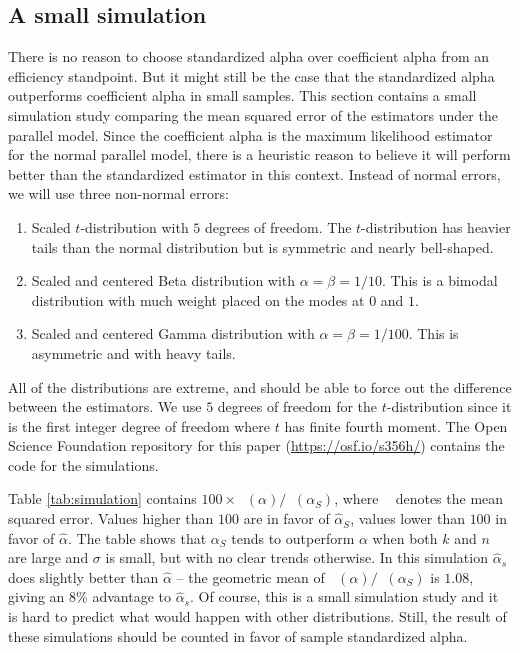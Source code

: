\documentclass[twoside]{article}
\DeclareMathOperator{\MSE}{MSE_Z}
\begin{document}
\subsection{A small simulation}
There is no reason to choose standardized alpha over coefficient alpha from an efficiency standpoint. But it might still be the case
that the standardized alpha outperforms coefficient alpha
in small samples. This section contains a small simulation
study comparing the mean squared error of the estimators under
the parallel model. Since the coefficient alpha is the maximum likelihood
estimator for the normal parallel model, there is a heuristic reason
to believe it will perform better than the standardized estimator
in this context. Instead of normal errors, we will use three non-normal
errors:

\begin{enumerate}
\item Scaled $t$-distribution with $5$ degrees of freedom. The $t$-distribution
has heavier tails than the normal distribution but is symmetric and nearly bell-shaped. 
\item Scaled and centered Beta distribution with $\alpha=\beta=1/10$. This is a bimodal distribution with much weight placed on the modes at $0$ and $1$. 
\item Scaled and centered Gamma distribution with $\alpha=\beta=1/100$. This is asymmetric and with heavy tails. 
\end{enumerate}

All of the distributions are extreme, and should be able to force out the difference between the estimators. We use $5$ degrees of freedom for the $t$-distribution since it is the first integer degree of freedom where $t$ has finite fourth moment. The Open Science Foundation repository for this paper (\url{https://osf.io/s356h/}) contains the code for the simulations.



Table \ref{tab:simulation} contains $100 \times \MSE(\alpha)/\MSE(\alpha_S)$, where $\MSE$ denotes the mean squared error. Values higher than $100$ are in favor of $\hat{\alpha}_S$, values lower than $100$ in favor of $\hat{\alpha}$. The table shows that $\alpha_S$ tends to outperform $\alpha$ when both $k$ and $n$ are large and $\sigma$ is small, but with no clear trends otherwise. In this simulation $\hat{\alpha}_s$ does slightly better than $\hat{\alpha}$ -- the geometric mean of $\MSE(\alpha)/\MSE({\alpha_S})$ is $1.08$, giving an $8$\% advantage to $\hat{\alpha}_s$. Of course, this is a small simulation study and it is hard to predict what would happen with other distributions. Still, the result of these simulations should be counted in favor of sample standardized alpha.
\end{document}
